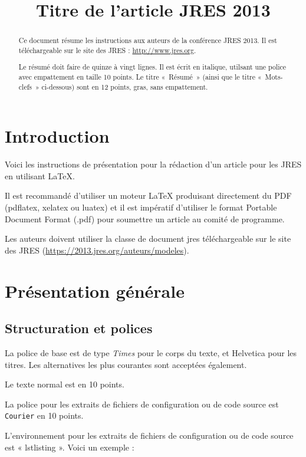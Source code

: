 \documentclass{jres}
\title{Titre de l'article JRES 2013}
\begin{document}
\maketitle

\begin{abstract}
Ce document résume les instructions aux auteurs de la conférence JRES 2013.
Il est téléchargeable sur le site des JRES : \url{http://www.jres.org}.

Le résumé doit faire de quinze à vingt lignes. Il est écrit en italique,
utilsant une police avec empattement en taille  10 points.
Le titre « Résumé » (ainsi que le titre «~Mots-clefs~» ci-dessous)
sont en 12 points, gras, sans empattement.
\end{abstract}


\section{Introduction}

Voici les instructions de présentation pour la rédaction d'un article
pour les JRES en utilisant \LaTeX{}.

Il est recommandé d'utiliser un moteur \LaTeX{} produisant directement
du PDF (pdflatex, xelatex ou luatex) et il est
impératif d'utiliser le format Portable Document Format (.pdf) pour
soumettre un article au comité de programme.

Les auteurs doivent utiliser la classe de document jres téléchargeable
sur le site des JRES (\url{https://2013.jres.org/auteurs/modeles}).

\section{Présentation générale}

\subsection{Structuration et polices}

La police de base est de type \emph{Times} pour le corps du texte, et
\textsf{Helvetica} pour les titres. Les alternatives les plus
courantes sont acceptées également.

Le texte  normal est en 10 points.

La police pour les extraits de fichiers de configuration ou de code
source est \texttt{Courier} en 10 points.

L'environnement pour les extraits de fichiers de configuration ou
de code source  est « lstlisting ». Voici un exemple :
\end{document}
